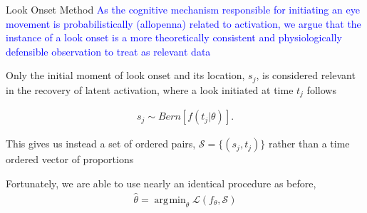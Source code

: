 \documentclass{beamer}
\DeclareMathOperator*{\argmin}{arg\!\min}
\newcommand{\vp}{\vspace{2mm}}
\providecommand{\cn}[1]{\textcolor{blue}{#1}}
\begin{document}
\begin{frame}{Look Onset Method}
\cn{As the cognitive mechanism responsible for initiating an eye movement is probabilistically (allopenna) related to activation, we argue that the instance of a look onset is a more theoretically consistent and physiologically defensible observation to treat as relevant data} \vp


Only the initial moment of look onset and its location, $s_j$, is considered relevant in the recovery of latent activation, where a look initiated at time $t_j$ follows
\vspace{-2mm}

\begin{align*}
s_j \sim Bern \left[f(t_j | \theta)\right].
\end{align*}

This gives us instead a set of ordered pairs, $\mathcal{S} = \{(s_j, t_j)\}$ rather than a time ordered vector of proportions  \vp

Fortunately, we are able to use nearly an identical procedure as before, 
\begin{align*}
\hat{\theta} = \argmin_{\theta} \mathcal{L}(f_{\theta}, \mathcal{S})
\end{align*}

\end{frame}

%
%
%
%
\end{document}
